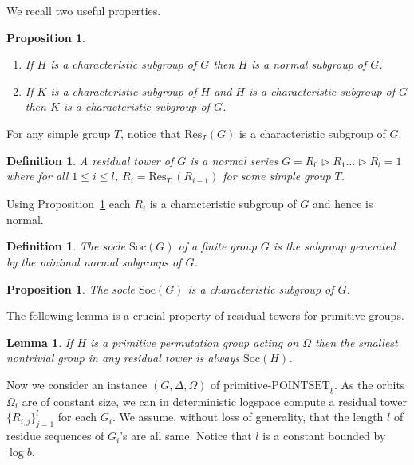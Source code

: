\documentclass[11pt]{article}
\newtheorem{lemma}[theorem]{Lemma}
\newtheorem{proposition}[theorem]{Proposition}
\newtheorem{definition}[theorem]{Definition}
\newcommand{\prpsb}[1]{\ensuremath{\textrm{primitive-POINTSET}_{#1}}}
\renewcommand{\Res}[2]{\ensuremath{\mathrm{Res}_{#1}\left({#2}\right)}}
\newcommand{\Soc}[1]{\ensuremath{\mathrm{Soc}\left(#1\right)}}
\begin{document}
We recall two useful properties.

\begin{proposition}\label{prop-char-subgroup}
  \begin{enumerate}
  \item If $H$ is a characteristic subgroup of $G$ then $H$ is a normal
    subgroup of $G$.
  \item If $K$ is a characteristic subgroup of $H$ and $H$ is a
    characteristic subgroup of $G$ then $K$ is a characteristic
    subgroup of $G$.
\end{enumerate}
\end{proposition}

For any simple group $T$, notice that $\Res{T}{G}$ is a characteristic
subgroup of $G$.

\begin{definition}
  A \emph{residual tower} of $G$ is a normal series $G = R_0 \rhd R_1
  \ldots\rhd R_l = 1$ where for all $1 \leq i \leq l$, $R_i =
  \Res{T_i}{R_{i-1}}$ for some simple group $T$.
\end{definition}

Using Proposition~\ref{prop-char-subgroup} each $R_i$ is a
characteristic subgroup of $G$ and hence is normal.

\begin{definition}
  The \emph{socle} $\Soc{G}$ of a finite group $G$ is the subgroup
  generated by the minimal normal subgroups of $G$.
\end{definition}

\begin{proposition}
  The socle $\Soc{G}$ is a characteristic subgroup of $G$.
\end{proposition}

The following lemma is a crucial property of residual towers for
primitive groups.

\begin{lemma}{\rm\cite{luks}}\label{lem-smallest}
  If $H$ is a primitive permutation group acting on $\Omega$ then the
  smallest nontrivial group in any residual tower is always $\Soc{H}$.
\end{lemma}

Now we consider an instance $(G,\Delta,\Omega)$ of $\prpsb{b}$. As the
orbits $\Omega_i$ are of constant size, we can in deterministic
logspace compute a residual tower $\{ R_{i,j} \}_{j=1}^l$ for each
$G_i$. We assume, without loss of generality, that the length $l$ of
residue sequences of $G_i$'s are all same. Notice that $l$ is a
constant bounded by $\log b$.
\end{document}
